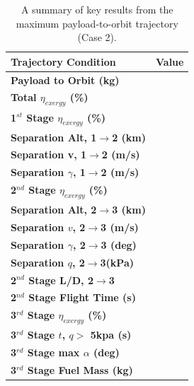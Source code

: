 \begin{table}[ht]
	\centering
\begin{tabular}{l c } 
	\hline \textbf{Trajectory Condition}
	& Value

	\\
	\hline \textbf{Payload to Orbit (kg)}
	& \textbf{\PayloadToOrbitStandardNoReturn}
	\\
	\textbf{Total $\eta_{exergy}$ (\%)}
	& \textbf{\totalExergyEffStandardNoReturn}
	\\
	\hline 
	\textbf{1$^{st}$ Stage $\eta_{exergy}$ (\%)}
	& \textbf{\firstExergyEffStandardNoReturn}
	\\
	\textbf{Separation Alt, 1$\rightarrow$2 (km)}
	& \firstsecondSeparationAltStandardNoReturn
	\\
	\textbf{Separation v, 1$\rightarrow$2 (m/s)}
	& \firstsecondSeparationvStandardNoReturn
	\\
	\textbf{Separation $\gamma$, 1$\rightarrow$2 (m/s)}
	& \firstsecondSeparationgammaStandardNoReturn
	\\
	\hline 
	\textbf{2$^{nd}$ Stage $\eta_{exergy}$ (\%)}
	& \textbf{\secondExergyEffStandardNoReturn}
	\\
	\textbf{Separation Alt, 2$\rightarrow$3 (km)}
	& \secondthirdSeparationAltStandardNoReturn
	\\
	\textbf{Separation $v$, 2$\rightarrow$3 (m/s)}
	& \secondthirdSeparationvStandardNoReturn
	\\
	\textbf{Separation $\gamma$, 2$\rightarrow$3 (deg)}
	& \secondthirdSeparationgammaStandardNoReturn
	\\
	\textbf{Separation $q$, 2$\rightarrow$3(kPa)}
	& \secondthirdSeparationqStandardNoReturn
	\\
	\textbf{2$^{nd}$ Stage L/D, 2$\rightarrow$3}
	& \secondthirdSeparationLDStandardNoReturn
	\\
	\textbf{2$^{nd}$ Stage Flight Time (s)}
	& \secondFlightTimeStandardNoReturn
	\\
	\hline 
	\textbf{3$^{rd}$ Stage $\eta_{exergy}$ (\%)}
	& \textbf{\thirddExergyEffStandardNoReturn}
	\\
	\textbf{3$^{rd}$ Stage $t$, $q >$ 5kpa (s)}
	& \thirdqOverFiveStandardNoReturn
	\\
	\textbf{3$^{rd}$ Stage max $\alpha$ (deg)}
	& \thirdmaxAoAStandardNoReturn
	\\
	\textbf{3$^{rd}$ Stage Fuel Mass (kg)}
	& \thirdmFuelStandardNoReturn
	\\
	\hline 
\end{tabular} 
	\caption{A summary of key results from the maximum payload-to-orbit trajectory (Case 2).}
	\label{tab:summaryStandardNoReturn}
\end{table}







